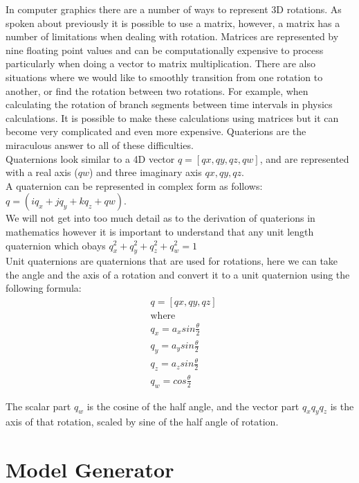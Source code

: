 In computer graphics there are a number of ways to represent 3D rotations. As spoken about previously it is possible to use a matrix, however, a matrix has a number of limitations when dealing with rotation. Matrices are represented by nine floating point values and can be computationally expensive to process particularly when doing a vector to matrix multiplication. There are also situations where we would like to smoothly transition from one rotation to another, or find the rotation between two rotations. For example, when calculating the rotation of branch segments between time intervals in physics calculations. It is possible to make these calculations using matrices but it can become very complicated and even more expensive. Quaterions are the miraculous answer to all of these difficulties.\\
Quaternions look similar to a 4D vector $ q = [qx, qy, qz, qw]$, and are represented with a real axis ($qw$) and three imaginary axis $qx, qy, qz$.\\
A quaternion can be represented in complex form as follows: $q = (iq_x + jq_y + kq_z + qw)$. \\ 
We will not get into too much detail as to the derivation of quaterions in mathematics however it is important to understand that any unit length quaternion which obays $q_x^2 + q_y^2 + q_z^2 + q_w^2 = 1$ \\ 



Unit quaternions are quaternions that are used for rotations, here we can take the angle and the axis of a rotation and convert it to a unit quaternion using the following formula: \\
\begin{equation}
\begin{aligned}
& q = [qx, qy, qz]\\
& \text{where} \\
& q_x = a_x sin \frac{\theta}{2}\\
& q_y = a_y sin \frac{\theta}{2}\\
& q_z = a_z sin \frac{\theta}{2}\\
& q_w = cos \frac{\theta}{2}
\end{aligned}
\end{equation}

The scalar part $q_w$ is the cosine of the half angle, and the vector part $q_x q_y q_z$ is the axis of that rotation, scaled by sine of the half angle of rotation.  


\section{Model Generator}

